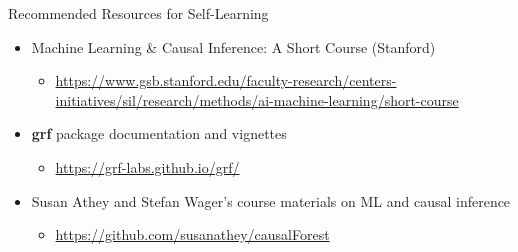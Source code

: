 \documentclass[hyperref={pdfpagelabels=false}]{beamer}
\begin{document}
\begin{frame}{Recommended Resources for Self-Learning}
	\begin{itemize}
		\item Machine Learning \& Causal Inference: A Short Course (Stanford)
		\vspace{0.2cm}
		\begin{itemize}
			\item \url{https://www.gsb.stanford.edu/faculty-research/centers-initiatives/sil/research/methods/ai-machine-learning/short-course}
			\vspace{0.2cm}
		\end{itemize}
		\item \textbf{grf} package documentation and vignettes
		\vspace{0.2cm}
		\begin{itemize}
			\item \url{https://grf-labs.github.io/grf/}
			\vspace{0.2cm}
		\end{itemize}
		\item Susan Athey and Stefan Wager's course materials on ML and causal inference
		\vspace{0.2cm}
		\begin{itemize}
			\item \url{https://github.com/susanathey/causalForest}
		\end{itemize}
	\end{itemize}
\end{frame}
\end{document}
